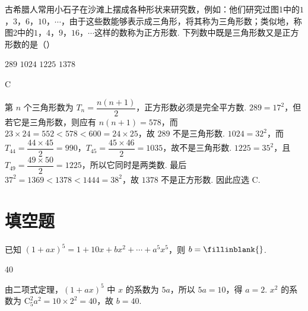 \begin{problem}
古希腊人常用小石子在沙滩上摆成各种形状来研究数，例如：他们研究过图1中的\(1\)，\(3\)，\(6\)，\(10\)，\(\cdots\)，由于这些数能够表示成三角形，将其称为三角形数；类似地，称图2中的\(1\)，\(4\)，\(9\)，\(16\)，\(\cdots\)这样的数称为正方形数. 下列数中既是三角形数又是正方形数的是（\quad）

\FloatBarrier

\choices
    {\(289\)}
    {\(1024\)}
    {\(1225\)}
    {\(1378\)}
\end{problem}

\begin{answer}
C
\end{answer}

\begin{solution}
第 \(n\) 个三角形数为 \(T_n=\dfrac{n(n+1)}{2}\)，正方形数必须是完全平方数. \(289=17^2\)，但若它是三角形数，则应有 \(n(n+1)=578\)，而 \(23\times24=552<578<600=24\times25\)，故 \(289\) 不是三角形数. \(1024=32^2\)，而 \(T_{44}=\dfrac{44\times45}{2}=990\)，\(T_{45}=\dfrac{45\times46}{2}=1035\)，故不是三角形数. \(1225=35^2\)，且 \(T_{49}=\dfrac{49\times50}{2}=1225\)，所以它同时是两类数. 最后 \(37^2=1369<1378<1444=38^2\)，故 \(1378\) 不是正方形数. 因此应选 C.
\end{solution}

\section{填空题}

\begin{problem}
已知 \( (1 + ax)^{5} = 1 + 10x + bx^{2} + \cdots + a^{5}x^{5} \)，则 \(b=\fillinblank{}\).
\end{problem}

\begin{answer}
40
\end{answer}

\begin{solution}
由二项式定理，\((1+ax)^5\) 中 \(x\) 的系数为 \(5a\)，所以 \(5a=10\)，得 \(a=2\). \(x^2\) 的系数为 \(\mathrm C_5^2a^2=10\times2^2=40\)，故 \(b=40\).
\end{solution}

